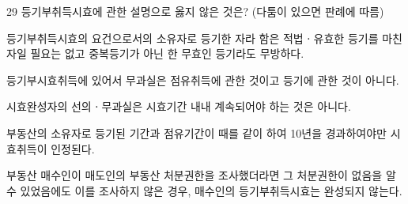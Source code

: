 \begin{question}{29}
등기부취득시효에 관한 설명으로 옳지 않은 것은? (다툼이 있으면 판례에 따름)
\begin{choices}
  \item 등기부취득시효의 요건으로서의 소유자로 등기한 자라 함은 적법ㆍ유효한 등기를 마친 자일 필요는 없고 중복등기가 아닌 한 무효인 등기라도 무방하다.
  \item 등기부시효취득에 있어서 무과실은 점유취득에 관한 것이고 등기에 관한 것이 아니다.
  \item 시효완성자의 선의ㆍ무과실은 시효기간 내내 계속되어야 하는 것은 아니다.
  \item 부동산의 소유자로 등기된 기간과 점유기간이 때를 같이 하여 10년을 경과하여야만 시효취득이 인정된다.
  \item 부동산 매수인이 매도인의 부동산 처분권한을 조사했더라면 그 처분권한이 없음을 알 수 있었음에도 이를 조사하지 않은 경우, 매수인의 등기부취득시효는 완성되지 않는다.
\end{choices}
\end{question}
